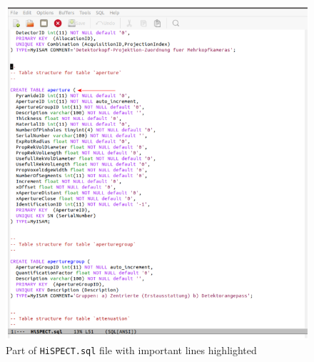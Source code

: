 \documentclass[12pt]{article}
\begin{document}
\begin{figure}[htp]
\centering
\includegraphics[scale=0.6]{figs/HiSPECTaperture.png}
\caption{Part of \texttt{HiSPECT.sql} file with important lines highlighted}
\label{fig:HiSPECTaperture}
\end{figure}
\end{document}
